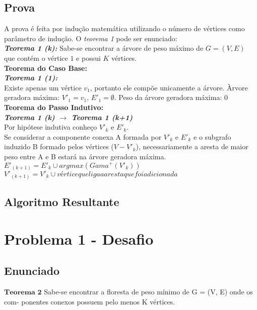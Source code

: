 \documentclass[twoside]{article}
\begin{document}
\begin{multicols}{2}
\subsection{ Prova }
\indent A prova é feita por indução matemática utilizando o número de vértices como parâmetro de indução. O \textit{teorema 1} pode ser enunciado:\\

\textit{\textbf{Teorema 1 (k):}} Sabe-se encontrar a árvore de peso máximo de $G=(V,E)$ que contém o vértice $1$ e possui $K$ vértices.\\

\textbf{Teorema do Caso Base:}\\

\textit{\textbf{Teorema 1 (1):}}\\
Existe apenas um vértice $v_1$, portanto ele compõe unicamente a árvore.
Àrvore geradora máxima: $V'_1 = {v_1}$, $E'_1 = \emptyset$.
Peso da árvore geradora máxima: 0\\

\textbf{Teorema do Passo Indutivo:}\\

\textit{\textbf{Teorema 1 (k) $\rightarrow$ Teorema 1 (k+1)}}\\
Por hipótese indutiva conheço $V'_k$ e $E'_k$.\\
Se considerar a componente conexa A formada por $V'_k$ e $E'_k$ e o subgrafo induzido B formado pelos
vértices ($V - V'_k$), necessariamente a aresta de maior peso entre A e B estará na árvore
geradora máxima.\\

$E'_(k+1) = E'_k \cup {argmax(Gama^+(V'_k))}$\\
$V'_(k+1) = V'_k \cup {vértice que liga a aresta que foi adicionada}$\\

\subsection{ Algoritmo Resultante }

\newpage
\section{Problema 1 - Desafio}

\subsection{ Enunciado }
\indent $\mathbf{Teorema}$ $\mathbf{2}$ Sabe-se encontrar a floresta de peso mínimo de G = (V, E) onde os com-
ponentes conexos possuem pelo menos K vértices.



\end{multicols}
\end{document}
